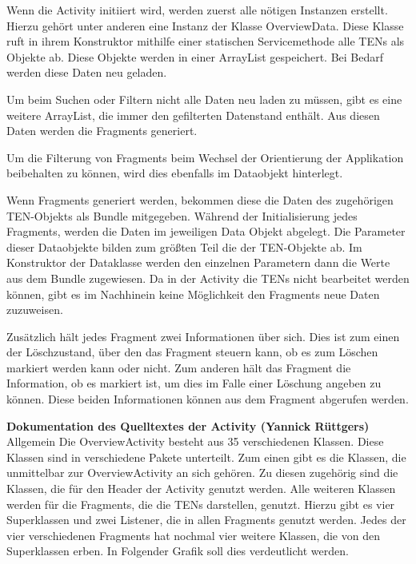 Wenn die Activity initiiert wird, werden zuerst alle nötigen Instanzen erstellt. Hierzu gehört unter anderen eine Instanz der Klasse OverviewData. Diese Klasse ruft in ihrem Konstruktor mithilfe einer statischen Servicemethode alle TENs als Objekte ab. Diese Objekte werden in einer ArrayList gespeichert. Bei Bedarf werden diese Daten neu geladen.

Um beim Suchen oder Filtern nicht alle Daten neu laden zu müssen, gibt es eine weitere ArrayList, die immer den gefilterten Datenstand enthält. Aus diesen Daten werden die Fragments generiert.

Um die Filterung von Fragments beim Wechsel der Orientierung der Applikation beibehalten zu können, wird dies ebenfalls im Dataobjekt hinterlegt.

Wenn Fragments generiert werden, bekommen diese die Daten des zugehörigen TEN-Objekts als Bundle mitgegeben. Während der Initialisierung jedes Fragments, werden die Daten im jeweiligen Data Objekt abgelegt. Die Parameter dieser Dataobjekte bilden zum größten Teil die der TEN-Objekte ab. Im Konstruktor der Dataklasse werden den einzelnen Parametern dann die Werte aus dem Bundle zugewiesen. Da in der Activity die TENs nicht bearbeitet werden können, gibt es im Nachhinein keine Möglichkeit den Fragments neue Daten zuzuweisen.

Zusätzlich hält jedes Fragment zwei Informationen über sich. Dies ist zum einen der Löschzustand, über den das Fragment steuern kann, ob es zum Löschen markiert werden kann oder nicht. Zum anderen hält das Fragment die Information, ob es markiert ist, um dies im Falle einer Löschung angeben zu können. Diese beiden Informationen können aus dem Fragment abgerufen werden.

\textbf{Dokumentation des Quelltextes der Activity (Yannick Rüttgers)}\\
Allgemein
Die OverviewActivity besteht aus 35 verschiedenen Klassen. Diese Klassen sind in verschiedene Pakete unterteilt.
Zum einen gibt es die Klassen, die unmittelbar zur OverviewActivity an sich gehören. Zu diesen zugehörig sind die Klassen, die für den Header der Activity genutzt werden.
Alle weiteren Klassen werden für die Fragments, die die TENs darstellen, genutzt. Hierzu gibt es vier Superklassen und zwei Listener, die in allen Fragments genutzt werden. Jedes der vier verschiedenen Fragments hat nochmal vier weitere Klassen, die von den Superklassen erben.
In Folgender Grafik soll dies verdeutlicht werden.
 

